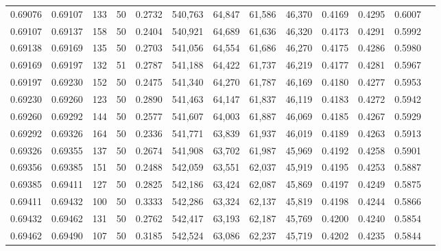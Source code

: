 \begin{tabular}{rrrrrrrrrrrrr}
0.69076 & 0.69107 &   133 &  50 &                                     0.2732 & 540,763 &  64,847 &  61,586 &  46,370 & 0.4169 & 0.4295 & 0.6007 \\
0.69107 & 0.69137 &   158 &  50 &                                     0.2404 & 540,921 &  64,689 &  61,636 &  46,320 & 0.4173 & 0.4291 & 0.5992 \\
0.69138 & 0.69169 &   135 &  50 &                                     0.2703 & 541,056 &  64,554 &  61,686 &  46,270 & 0.4175 & 0.4286 & 0.5980 \\
0.69169 & 0.69197 &   132 &  51 &                                     0.2787 & 541,188 &  64,422 &  61,737 &  46,219 & 0.4177 & 0.4281 & 0.5967 \\
0.69197 & 0.69230 &   152 &  50 &                                     0.2475 & 541,340 &  64,270 &  61,787 &  46,169 & 0.4180 & 0.4277 & 0.5953 \\
0.69230 & 0.69260 &   123 &  50 &                                     0.2890 & 541,463 &  64,147 &  61,837 &  46,119 & 0.4183 & 0.4272 & 0.5942 \\
0.69260 & 0.69292 &   144 &  50 &                                     0.2577 & 541,607 &  64,003 &  61,887 &  46,069 & 0.4185 & 0.4267 & 0.5929 \\
0.69292 & 0.69326 &   164 &  50 &                                     0.2336 & 541,771 &  63,839 &  61,937 &  46,019 & 0.4189 & 0.4263 & 0.5913 \\
0.69326 & 0.69355 &   137 &  50 &                                     0.2674 & 541,908 &  63,702 &  61,987 &  45,969 & 0.4192 & 0.4258 & 0.5901 \\
0.69356 & 0.69385 &   151 &  50 &                                     0.2488 & 542,059 &  63,551 &  62,037 &  45,919 & 0.4195 & 0.4253 & 0.5887 \\
0.69385 & 0.69411 &   127 &  50 &                                     0.2825 & 542,186 &  63,424 &  62,087 &  45,869 & 0.4197 & 0.4249 & 0.5875 \\
0.69411 & 0.69432 &   100 &  50 &                                     0.3333 & 542,286 &  63,324 &  62,137 &  45,819 & 0.4198 & 0.4244 & 0.5866 \\
0.69432 & 0.69462 &   131 &  50 &                                     0.2762 & 542,417 &  63,193 &  62,187 &  45,769 & 0.4200 & 0.4240 & 0.5854 \\
0.69462 & 0.69490 &   107 &  50 &                                     0.3185 & 542,524 &  63,086 &  62,237 &  45,719 & 0.4202 & 0.4235 & 0.5844 \\

\end{tabular}
